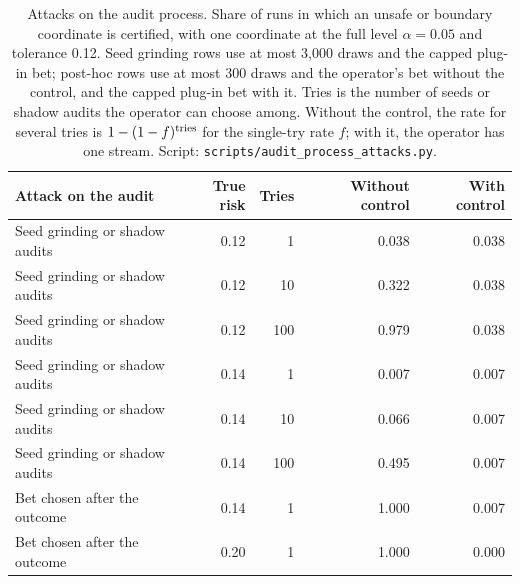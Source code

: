 \begin{table}[t]\centering\small
\caption{Attacks on the audit process. Share of runs in which an unsafe or boundary coordinate is certified, with one coordinate at the full level $\alpha=0.05$ and tolerance 0.12. Seed grinding rows use at most 3{,}000 draws and the capped plug-in bet; post-hoc rows use at most 300 draws and the operator's bet without the control, and the capped plug-in bet with it. Tries is the number of seeds or shadow audits the operator can choose among. Without the control, the rate for several tries is $1-(1-f)^{\rm tries}$ for the single-try rate $f$; with it, the operator has one stream. Script: \nolinkurl{scripts/audit_process_attacks.py}.}\label{tab:audit-process}
\begin{tabular}{lrrrr}
\toprule
Attack on the audit & True risk & Tries & Without control & With control\\\midrule
Seed grinding or shadow audits & 0.12 & 1 & 0.038 & 0.038 \\
Seed grinding or shadow audits & 0.12 & 10 & 0.322 & 0.038 \\
Seed grinding or shadow audits & 0.12 & 100 & 0.979 & 0.038 \\
Seed grinding or shadow audits & 0.14 & 1 & 0.007 & 0.007 \\
Seed grinding or shadow audits & 0.14 & 10 & 0.066 & 0.007 \\
Seed grinding or shadow audits & 0.14 & 100 & 0.495 & 0.007 \\
Bet chosen after the outcome & 0.14 & 1 & 1.000 & 0.007 \\
Bet chosen after the outcome & 0.20 & 1 & 1.000 & 0.000 \\
\bottomrule
\end{tabular}
\end{table}
